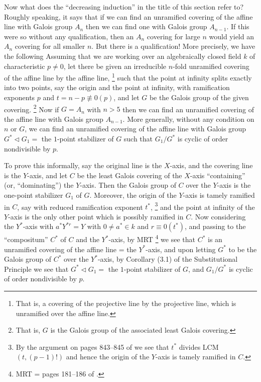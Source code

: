 Now what does the ``decreasing induction'' in the title of 
this section
refer to? Roughly speaking, it says that if we can find an 
unramified
covering of the affine line with Galois group $A_n$ then 
we can find one
with Galois group $A_{n-1}$. If this were so without any 
qualification,
then an $A_n$ covering for large $n$ would yield an $A_n$ 
covering for all
smaller $n$. But there is a qualification!  More 
precisely, we have
the following
{} 
Assuming that we are working over an algebraically closed 
field $k$ of 
characteristic $p\ne 0$, let there be given an irreducible 
$n$-fold 
unramified covering of the affine line by the affine line, 
\footnote{That is, a covering of the projective line by 
the projective
line, which is unramified over the affine line.}
such that the point 
at infinity splits exactly into two points, say the origin 
and the point at 
infinity, with ramification exponents $p$ and 
$t=n-p\not\equiv 0(p)$, and let 
$G$ be the Galois group of the given covering.
\footnote{That is, $G$ is the Galois group of the 
associated least
Galois covering.}
Now if $G=A_n$ with $n>5$ then we can find an unramified 
covering of the 
affine line with Galois group $A_{n-1}$.  More generally, 
without any 
condition on $n$ or $G$, we can find an unramified 
covering of the affine 
line with Galois group $G^*\triangleleft G_1=$ the 
$1$-point stabilizer
of $G$ such that $G_1/G^*$ is cyclic of order nondivisible 
by $p$.

To prove this informally, say the original line is the 
$X$-axis,
and the covering line is the $Y$-axis, and let $C$ be 
the least Galois covering of the $X$-axis ``containing'' 
(or, ``dominating'') the $Y$-axis. Then the Galois
group of $C$ over the $Y$-axis is the one-point stabilizer 
$G_1$ of $G$. 
Moreover, the origin of the $Y$-axis is tamely
ramified in $C$, say with reduced ramification exponent 
$t^*$, 
\footnote{By the argument on pages 843--845 of \cite{A3} 
we see that $t^*$
divides LCM$(t,(p-1)!)$ and hence the origin of the 
$Y$-axis is
tamely ramified in $C$.}
and the point at infinity of 
the $Y$-axis is the only other point which is possibly 
ramified in $C$. 
Now considering the $Y^*$-axis with $a^*Y^{*r}=Y$ with 
$0\ne a^*\in k$ and 
$r\equiv 0(t^*)$, and passing to
the ``compositum'' $C^*$ of $C$ and the $Y^*$-axis, by MRT 
\footnote{MRT = pages 181--186 of \cite{A5}.}
we see that
$C^*$ is an unramified covering of the affine line = the 
$Y^*$-axis, and 
upon letting $G^*$ to be the Galois group of $C^*$ over the
$Y^*$-axis, by Corollary (3.1) of the Substitutional 
Principle we see that
$G^*\triangleleft G_1=$ the $1$-point stabilizer
of $G$, and $G_1/G^*$ is cyclic of order nondivisible by 
$p$.

